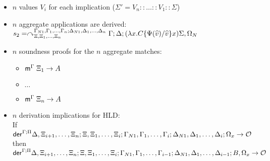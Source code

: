    \begin{itemize}[leftmargin=\secondm]
      \item $n$ values $V_i$ for each implication ($\Sigma' = V_n :: \dots :: V_1 :: \Sigma$)
      \item $n$ aggregate applications are derived:\\
      $s_2 = \curvearrowright_{\Xi, \Xi_1, \dotsc, \Xi_n}^{\Gamma_{N1},
      \Gamma_1, \dotsc, \Gamma_n; \Delta_{N1}, \Delta_1, \dotsc,
         \Delta_n} \Gamma; \Delta; (\lambda x.  C\{\Psi(\widehat{v})/\widehat{v}\} x) \Sigma,
            \Omega_N$
      \item $n$ soundness proofs for the $n$ aggregate matches:
      \begin{itemize}[leftmargin=\thirdm]
         \item $\mathsf{m}^{\Gamma} \; \Xi_1 \rightarrow A$
         \item $\dots$
         \item $\mathsf{m}^{\Gamma} \; \Xi_n \rightarrow A$
      \end{itemize}

      \item $n$ derivation implications for HLD: \\
      If $\mathsf{der}^{\Gamma ; \Pi} \Delta, \Xi_{i+1}, \dotsc, \Xi_{n} ; \Xi, \Xi_1,
         \dotsc, \Xi_i; \Gamma_{N1}, \Gamma_1, \dotsc, \Gamma_i; \Delta_{N1},
            \Delta_1, \dotsc, \Delta_i; \Omega_x \rightarrow \mathcal{O}$ then\\
            \hspace{5cm} $\mathsf{der}^{\Gamma ; \Pi} \Delta, \Xi_{i+1}, \dotsc, \Xi_{n} ; \Xi, \Xi_1,
            \dotsc, \Xi_i; \Gamma_{N1}, \Gamma_1, \dotsc, \Gamma_{i-1}; \Delta_{N1},
            \Delta_1, \dotsc, \Delta_{i-1}; B, \Omega_x \rightarrow \mathcal{O}$
   \end{itemize}

